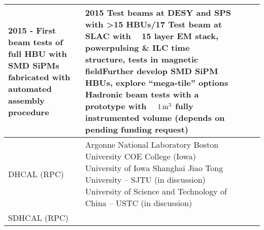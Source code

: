 \begin{landscape}
\begin{table}[h]
\begin{adjustbox}{max width=1\textwidth}
\begin{tabularx}{2\textwidth}{lXXXX}
     2015 - First beam tests of full HBU with SMD SiPMs fabricated with automated assembly procedure                                         &
     2015 Test beams at DESY and SPS with \textgreater 15 HBUs\newline
     2016/17 Test beam at SLAC with ~ 15 layer EM stack, powerpulsing \& ILC time structure, tests in magnetic fieldFurther develop SMD SiPM HBUs, explore ``mega-tile'' options \newline
    Hadronic beam tests with a prototype with ~ $\unit[1]{m^3}$ fully instrumented volume (depends on pending funding request) \\
    \midrule
    DHCAL (RPC)	&
    Argonne National Laboratory\newline
    Boston University                  \newline
    COE College (Iowa)                         \newline
    University of Iowa                                 \newline
    Shanghai Jiao Tong University -- SJTU (in discussion)      \newline
    University of Science and Technology of China -- USTC (in discussion) &
     &
     &                                                                                                                                                                                                                                   \\
     \midrule
    SDHCAL (RPC)                                                                                                   &                                                                                                                                         &                                                                                                                                                                                                                                                                                                                                                                                      &                                                                                                                                                                                                                                                                 &                                                                                                                                                                                                                                     \\

\end{tabularx}
\end{adjustbox}
\end{table}
\end{landscape}

